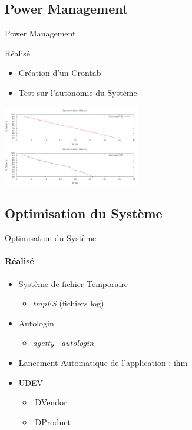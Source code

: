 \documentclass[11pt]{beamer}
\begin{document}
	\subsection{Power Management}
	\begin{frame}[fragile]{Power Management}
	\begin{block}{Réalisé}
	\begin{itemize}
			\item Création d'un Crontab
			\item Test sur l'autonomie du Système
	\end{itemize}
	\end{block}
	
	\begin{center}
		\includegraphics[width=6cm]{common/power_management.png}
	\end{center}
	\end{frame}
	\subsection{Optimisation du Système}
	\begin{frame}{Optimisation du Système}
	\framesubtitle{Réalisé}
	 \begin{itemize}
	 \item  Système de fichier Temporaire \\
	    	 \begin{itemize}
		    \item  \textit{tmpFS} (fichiers log)
		  \end{itemize}
	\item Autologin \\
	  	  \begin{itemize}
		    \item  \textit{agetty --autologin}
		  \end{itemize}
	\item Lancement Automatique de l'application : ihm\\
	\item UDEV \\
	  \begin{itemize}
		    \item iDVendor
		    \item iDProduct
	  \end{itemize}
	\end{itemize}
	\end{frame}
	
\end{document}
